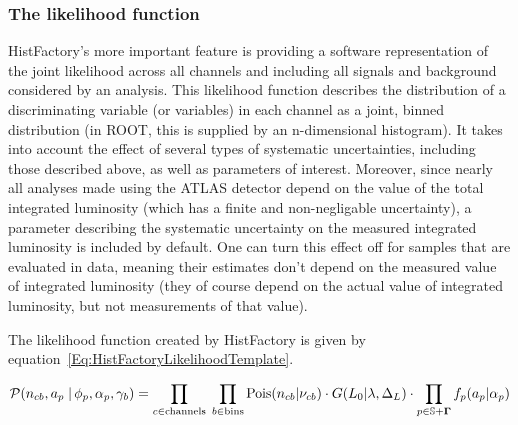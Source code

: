 \subsubsection{The likelihood function}

HistFactory's more important feature is providing a software representation of the joint likelihood across all channels and including all signals and background considered by an analysis.
This likelihood function describes the distribution of a discriminating variable (or variables) in each channel as a joint, binned distribution (in ROOT, this is supplied by an n-dimensional histogram).
It takes into account the effect of several types of systematic uncertainties, including those described above, as well as parameters of interest.
Moreover, since nearly all analyses made using the ATLAS detector depend on the value of the total integrated luminosity (which has a finite and non-negligable uncertainty),
a parameter describing the systematic uncertainty on the measured integrated luminosity is included by default.
One can turn this effect off for samples that are evaluated in data, meaning their estimates don't depend on the measured value of integrated luminosity (they of course depend on the actual value of integrated luminosity, but not measurements of that value).

The likelihood function created by HistFactory is given by equation~\ref{Eq:HistFactoryLikelihoodTemplate}.

\begin{eqnarray}
\label{Eq:HistFactoryLikelihoodTemplate}
\nonumber
{\cal P}( n_{cb}, a_p \; |\,\phi_p,\alpha_p,\gamma_b)=   \prod_{c\in \textrm{channels}} \; \prod_{b\in \textrm{bins}} \textrm{Pois}(n_{cb}|\nu_{cb}) \cdot G(L_0 | \lambda, \Delta_L) \cdot \prod_{p\in \mathbb{S}+\mathbf{\Gamma}} f_p(a_p|\alpha_p)
\end{eqnarray}

